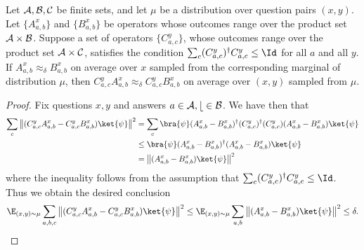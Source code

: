 \begin{fact}
  \label{fact:add-a-proj}
  Let $\cal{A},\cal{B},\cal{C}$ be finite sets, and let $\mu$ be a distribution
  over question pairs $(x,y)$.
  Let $\{A_{a,b}^x\}$ and $\{B_{a,b}^x\}$ be operators whose outcomes range over the
  product set $\cal{A} \times \cal{B}$.
  Suppose a set of operators $\{C_{a,c}^y\}$, whose outcomes range over the
  product set $\cal{A} \times \cal{C}$, satisfies the condition $\sum_{c}
  (C_{a,c}^y)^\dagger C_{a,c}^y \leq \Id$ for all $a$ and all $y$.
  If $A_{a,b}^x \approx_\delta B_{a,b}^x$ on average over $x$ sampled from the
  corresponding marginal of distribution $\mu$, then $C^y_{a,c} A^x_{a,b}
  \approx_\delta C^y_{a,c} B^x_{a,b}$ on average over $(x,y)$ sampled from $\mu$.
\end{fact}
\begin{proof}
  Fix questions $x,y$ and answers $a \in \cal{A},b \in \cal{B}$. We have then that
  \begin{align}
    \sum_{c} \left \| (C^y_{a,c} A^x_{a,b} - C^y_{a,c} B^x_{a,b} ) \ket{\psi} \right \|^2
    & = \sum_{c} \bra{\psi} (A^x_{a,b} - B^x_{a,b})^\dagger (C^y_{a,c})^\dagger (C^y_{a,c})
      (A^x_{a,b} - B^x_{a,b} ) \ket{\psi}\\
    & \leq \bra{\psi} (A^x_{a,b} - B^x_{a,b})^\dagger
      (A^x_{a,b} - B^x_{a,b} ) \ket{\psi} \\
    & = \left \| (A^x_{a,b} - B^x_{a,b})\ket{\psi} \right \|^2
  \end{align}
  where the inequality follows from the assumption that $\sum_c (C_{a,c}^y)^\dagger
  C_{a,c}^y \leq \Id$.
  Thus we obtain the desired conclusion
  \begin{equation*}
    \E_{(x,y) \sim \mu} \sum_{a,b,c} \left \| (C^y_{a,c} A^x_{a,b} - C^y_{a,c} B^x_{a,b} )
      \ket{\psi} \right \|^2 	\leq \E_{(x,y) \sim \mu} \sum_{a,b}
    \left \| (A^x_{a,b} - B^x_{a,b})\ket{\psi} \right \|^2 \leq \delta.
  \end{equation*}
\end{proof}


